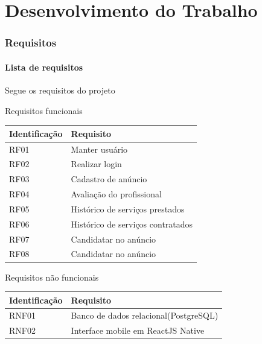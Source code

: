 
\chapter{Desenvolvimento do Trabalho}

\subsection{Requisitos}
\subsubsection{Lista de requisitos}
Segue os requisitos do projeto
\begin{quadro}[htb]
	\centering
	\caption{\label{Formatação do texto.}Requisitos funcionais}	
	\begin{tabular}{|l|p{11cm}|}
		\hline
		\textbf{Identificação}    & \textbf{Requisito}\\ \hline
		RF01        			  & Manter usuário\\ \hline
		RF02        			  & Realizar login\\ \hline
		RF03         			  & Cadastro de anúncio\\ \hline
		RF04        			  & Avaliação do profissional\\ \hline
		RF05        			  & Histórico de serviços prestados\\ \hline
		RF06        			  & Histórico de serviços contratados \\ \hline
		RF07        			  & Candidatar no anúncio \\ \hline
		RF08        			  & Candidatar no anúncio 
		\\ \hline
	\end{tabular}
\end{quadro}

\begin{quadro}[htb]
	\centering
	\caption{\label{Formatação do texto.}Requisitos não funcionais}	
	\begin{tabular}{|l|p{11cm}|}
		\hline
		\textbf{Identificação}    & \textbf{Requisito}\\ \hline
		RNF01        			  & Banco de dados relacional(PostgreSQL)\\ \hline
		RNF02        			  & Interface mobile em ReactJS Native\\ \hline
	\end{tabular}
\end{quadro}

